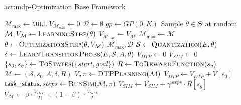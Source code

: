 \begin{algorithm}[t!]
	\caption{\acrshort{acr:mdp}-Optimization Base Framework}
	\label{alg:base-framework}
	\begin{algorithmic}[1]
		\State $\mathcal{M}_\mathsf{max} \gets \texttt{NULL}$
		\State $V_{\mathcal{M}_\mathsf{max}} \gets 0$
		\State $\mathcal{D} \gets \emptyset$ 
		\State $\mathit{gp} \gets GP(0, K)$ 
		\State Sample $\theta \in \Theta$ at random
		\Repeat
		\State $\mathcal{M}, V_\mathcal{M} \gets \textproc{LearningStep}(\theta)$
		\State $V_{\mathcal{M}_\mathsf{max}} \gets V_\mathcal{M}$
		\State $\mathcal{M}_\mathsf{max} \gets \mathcal{M}$
		\EndIf
		\State $\theta \gets \textproc{OptimizationStep}(\theta, V_\mathcal{M})$
		\State\Return $\mathcal{M}_\mathsf{max}, \mathcal{D}$
		\Statex
			\label{alg:line:learn}
			\State $\mathcal{S} \gets \textproc{Quantization}(E, \theta)$
			\State $\delta \gets \textproc{LearnTransitionProbs}(E, \mathcal{S}, A, \theta)$ 
			\State $V_\mathit{DTP} \gets 0$
			\State $V_\mathit{SIM} \gets 0$
			\State $\{s_0, s_g\} \gets \textproc{ToStates}(\{\mathit{start}, \mathit{goal}\})$
			\State $R \gets \textproc{ToRewardFunction}(s_g)$
			\State $\mathcal{M} \gets (\mathcal{S}, s_0, A, \delta, R)$
			\State $V, \pi \gets \textproc{DTPPlanning}(\mathcal{M})$	
			\State $V_\mathit{DTP} \gets V_\mathit{DTP} + V[s_0]$
				\State $\mathsf{task\_status}, \mathit{steps} \gets \textproc{RunSim}(\mathcal{M}, \pi)$
					\State $V_\mathit{SIM} \gets V_\mathit{SIM} + \gamma^\mathit{steps} \cdot R[s_g]$
				\EndIf
			\EndIf
			\EndFor
			\State $V_\mathcal{M} \gets \beta \cdot \frac{V_\mathit{DTP}}{|T|} + (1 - \beta) \cdot \frac{V_\mathit{SIM}}{|T|}$
			

\end{algorithmic}
\end{algorithm}
